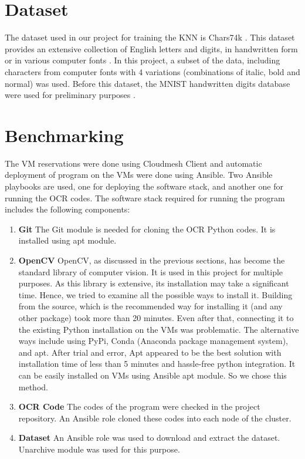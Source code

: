\documentclass[9pt,twocolumn,twoside]{../../styles/osajnl}
\begin{document}
\section{Dataset}
The dataset used in our project for training the KNN is Chars74k \cite{chars74k-dataset}.
This dataset provides an extensive collection of English letters and digits, 
in handwritten form or in various computer fonts \cite{de2009character}. In this project, a subset 
of the data, including characters from computer fonts with 4 variations (combinations
of italic, bold and normal) was used.
\newline
Before this dataset, the MNIST handwritten digits database were used for preliminary 
purposes \cite{mnist-dataset}.

\section{Benchmarking}
The VM reservations were done using Cloudmesh Client and automatic deployment of 
program on the VMs were done using Ansible. Two Ansible playbooks are used, one for 
deploying the software stack, and another one for running the OCR codes. The software stack
required for running the program includes the following components:
\begin{enumerate}
\item {\bfseries Git} The Git module is needed for cloning the OCR Python codes. 
It is installed using apt module.
\item{\bfseries OpenCV} OpenCV, as discussed in the previous sections, has become 
the standard library of computer vision. It is used in this project for multiple 
purposes. As this library is extensive, its installation may take a significant time.
Hence, we tried to examine all the possible ways to install it. Building from the source,
which is the recommended way for installing it (and any other package) took more than
20 minutes. Even after that, connecting it to the existing Python installation on the
VMs was problematic. The alternative ways include using PyPi, Conda (Anaconda package
management system), and apt. After trial and error, Apt appeared to be the best solution
with installation time of less than 5 minutes and hassle-free python integration. It can 
be easily installed on VMs using Ansible apt module. So we chose this method.
\item {\bfseries OCR Code} The codes of the program were checked in the project
repository. An Ansible role cloned these codes into each node of the cluster.
\item{\bfseries Dataset} An Ansible role was used to download and extract the
dataset. Unarchive module was used for this purpose.
\end{enumerate}
\end{document}
